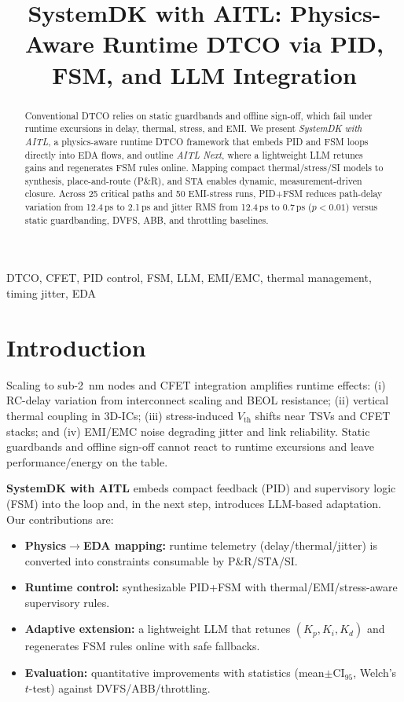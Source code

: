 \documentclass[conference]{IEEEtran}
\title{SystemDK with AITL: Physics-Aware Runtime DTCO via PID, FSM, and LLM Integration}
\author{%
  \IEEEauthorblockN{Shinichi Samizo}%
  \IEEEauthorblockA{Independent Semiconductor Researcher\\
  Email: \href{mailto:shin3t72@gmail.com}{shin3t72@gmail.com}}%
}
\newcommand{\CI}{\mathrm{CI}_{95}}
\begin{document}
\maketitle

\begin{abstract}
Conventional DTCO relies on static guardbands and offline sign-off, which fail under runtime excursions in delay, thermal, stress, and EMI. We present \emph{SystemDK with AITL}, a physics-aware runtime DTCO framework that embeds PID and FSM loops directly into EDA flows, and outline \emph{AITL Next}, where a lightweight LLM retunes gains and regenerates FSM rules online. Mapping compact thermal/stress/SI models to synthesis, place-and-route (P\&R), and STA enables dynamic, measurement-driven closure. Across 25 critical paths and 50 EMI-stress runs, PID+FSM reduces path-delay variation from 12.4\,ps to 2.1\,ps and jitter RMS from 12.4\,ps to 0.7\,ps ($p<0.01$) versus static guardbanding, DVFS, ABB, and throttling baselines.
\end{abstract}

\begin{IEEEkeywords}
DTCO, CFET, PID control, FSM, LLM, EMI/EMC, thermal management, timing jitter, EDA
\end{IEEEkeywords}

\section{Introduction}
Scaling to sub-\SI{2}{\nano\meter} nodes and CFET integration amplifies runtime effects: (i) RC-delay variation from interconnect scaling and BEOL resistance; (ii) vertical thermal coupling in 3D-ICs; (iii) stress-induced $V_\mathrm{th}$ shifts near TSVs and CFET stacks; and (iv) EMI/EMC noise degrading jitter and link reliability. Static guardbands and offline sign-off cannot react to runtime excursions and leave performance/energy on the table.

\textbf{SystemDK with AITL} embeds compact feedback (PID) and supervisory logic (FSM) into the loop and, in the next step, introduces LLM-based adaptation. Our contributions are:
\begin{itemize}
  \item \textbf{Physics$\rightarrow$EDA mapping:} runtime telemetry (delay/thermal/jitter) is converted into constraints consumable by P\&R/STA/SI.
  \item \textbf{Runtime control:} synthesizable PID+FSM with thermal/EMI/stress-aware supervisory rules.
  \item \textbf{Adaptive extension:} a lightweight LLM that retunes $(K_p,K_i,K_d)$ and regenerates FSM rules online with safe fallbacks.
  \item \textbf{Evaluation:} quantitative improvements with statistics (mean$\pm\CI$, Welch's $t$-test) against DVFS/ABB/throttling.
\end{itemize}
\end{document}
